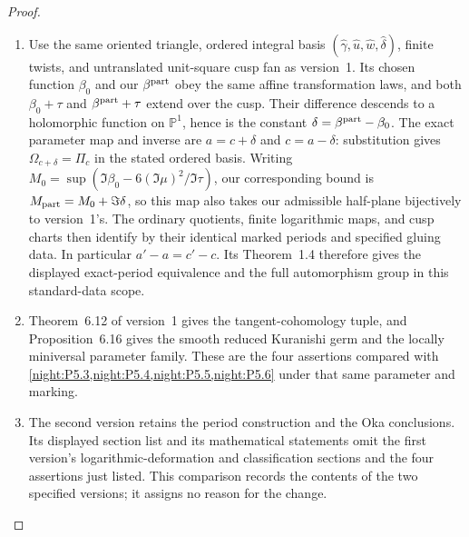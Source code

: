 \begin{proof}
\begin{enumerate}[label=\arabic*.]
\item Use the same oriented triangle, ordered integral basis
$(\widehat\gamma,\widehat u,\widehat w,\widehat\delta)$,
finite twists, and untranslated unit-square cusp fan as version~1.
Its chosen function $\beta_0$ and our $\beta^{\rm part}$ obey the
same affine transformation laws, and both $\beta_0+\tau$ and
$\beta^{\rm part}+\tau$ extend over the cusp. Their difference
descends to a holomorphic function on $\mathbb P^1$, hence is the
constant $\delta=\beta^{\rm part}-\beta_0$. The exact parameter
map and inverse are $a=c+\delta$ and $c=a-\delta$: substitution
gives $\Omega_{c+\delta}=\Pi_c$ in the stated ordered basis.
Writing $M_0=\sup(\Im\beta_0-6(\Im\mu)^2/\Im\tau)$,
our corresponding bound is $M_{\rm part}=M_0+\Im\delta$, so this
map also takes our admissible half-plane bijectively to version~1's.
The ordinary quotients, finite logarithmic maps, and cusp charts
then identify by their identical marked periods and specified
gluing data. In particular $a'-a=c'-c$. Its Theorem~1.4 therefore
gives the displayed exact-period equivalence and the full
automorphism group in this standard-data scope.
\item Theorem~6.12 of version~1 gives the tangent-cohomology tuple,
and Proposition~6.16 gives the smooth reduced Kuranishi germ and
the locally miniversal parameter family. These are the
four assertions compared with \cref{night:P5.3,night:P5.4,night:P5.5,night:P5.6}
under that same parameter and marking.
\item The second version retains the period construction and the
Oka conclusions. Its displayed section list and its mathematical
statements omit the first version's logarithmic-deformation and
classification sections and the four assertions just listed.
This comparison records the contents of the two specified versions;
it assigns no reason for the change.
\end{enumerate}
\end{proof}
